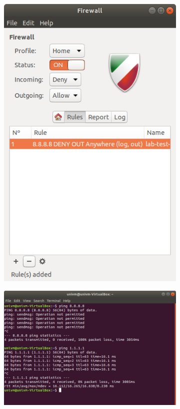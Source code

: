 \documentclass[
	a4paper,
	oneside,
	BCOR = 10mm,
	DIV = 12,
	12pt,
	headings = normal,
]{scrartcl}
\newlength{\gridunitwidth}
\begin{document}
\begin{figure}[!htbp]
\begin{subfigure}[b]{5 \gridunitwidth - 1em / 2}
				\includegraphics[width = \columnwidth]{./assets/10.png}
				\caption{}
				\label{subfig:02-02}
			\end{subfigure}
			\begin{subfigure}[b]{9 \gridunitwidth - 1em / 2}
				\includegraphics[width = \columnwidth]{./assets/11.png}

\end{subfigure}
\end{figure}
\end{document}
